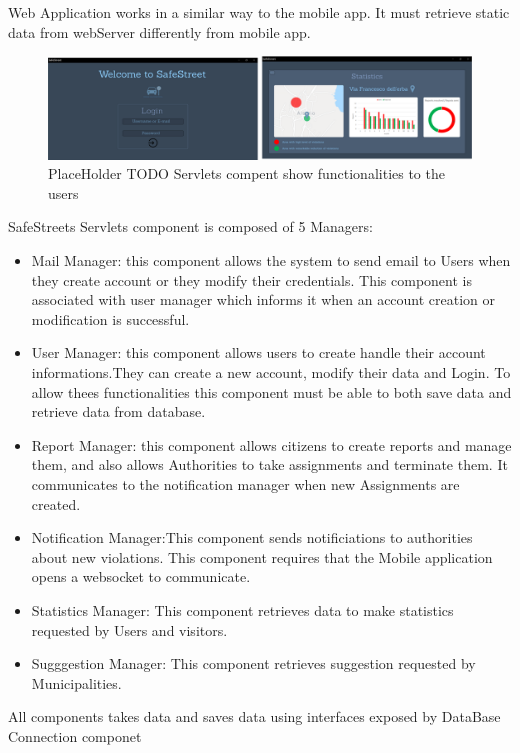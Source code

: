 Web Application works in a similar way to the mobile app. It must retrieve static data from webServer differently from mobile app.
\newline
\begin{figure}[h]
\centering
\includegraphics[width=\textwidth]{Images/desktop_common_interface.png}
\caption{\label{fig:ComWI}PlaceHolder TODO Servlets compent show functionalities to the users}
\end{figure}
 SafeStreets Servlets component is composed of 5 Managers:
\begin{itemize}
\item Mail Manager: this component allows the system to send email to Users when they create account or they modify their credentials. This component is associated with user manager which informs it when an account creation or modification is successful.
\item User Manager: this component allows users to create handle their account informations.They can create a new account, modify their data and Login. To allow thees functionalities this component must be able to both save data and retrieve data from database.
\item Report Manager: this component allows citizens to create reports and manage them, and also allows Authorities to take assignments and terminate them. It communicates to the notification manager when new Assignments are created.
\item Notification Manager:This component sends notificiations to authorities about new violations. This component requires that the Mobile application opens a websocket to communicate. 
\item Statistics Manager: This component retrieves data to make  statistics requested by Users and visitors.
\item Sugggestion Manager: This component retrieves suggestion requested by Municipalities.
\end{itemize}
All components takes data and saves data using interfaces exposed by DataBase Connection componet
